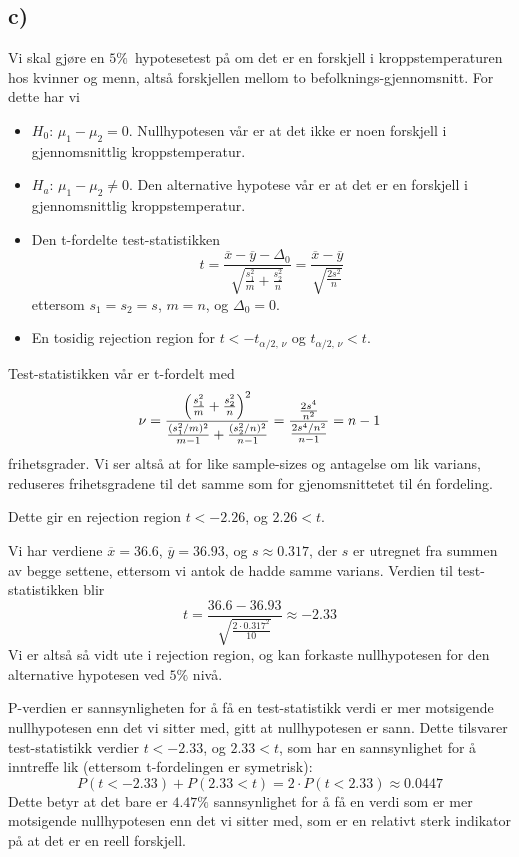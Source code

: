 \documentclass[12p,a4paper]{article}
\renewcommand{\bar}{\overline}
\begin{document}
\subsection*{c)}
Vi skal gjøre en $5\%$ hypotesetest på om det er en forskjell i kroppstemperaturen hos kvinner og menn, altså forskjellen mellom to befolknings-gjennomsnitt. For dette har vi
\begin{itemize}
    \item $H_0:\, \mu_1 - \mu_2 = 0$. Nullhypotesen vår er at det ikke er noen forskjell i gjennomsnittlig kroppstemperatur.
    \item $H_a:\, \mu_1 - \mu_2 \neq 0$. Den alternative hypotese vår er at det er en forskjell i gjennomsnittlig kroppstemperatur.
    \item Den t-fordelte test-statistikken \[ t = \frac{\bar{x} - \bar{y} - \Delta_0}{\sqrt{\frac{s_1^2}{m} + \frac{s_2^2}{n}}} = \frac{\bar{x} - \bar{y}}{\sqrt{\frac{2s^2}{n}}} \]
    ettersom $s_1 = s_2 = s$, $m=n$, og $\Delta_0 = 0$.
    \item En tosidig rejection region for $t < -t_{\alpha/2,\, \nu}$ og $ t_{\alpha/2,\, \nu} < t$.
\end{itemize}
Test-statistikken vår er t-fordelt med
\[
    \nu = \frac{\qty(\frac{s_1^2}{m}+\frac{s_2^2}{n})^2}{\frac{(s_1^2/m)^2}{m-1} + \frac{(s_2^2/n)^2}{n-1}}
    = \frac{\frac{2s^4}{n^2}}{\frac{2s^4/n^2}{n-1}} = n-1
\]
frihetsgrader. Vi ser altså at for like sample-sizes og antagelse om lik varians, reduseres frihetsgradene til det samme som for gjenomsnittetet til én fordeling.

Dette gir en rejection region $t < -2.26$, og $2.26 < t$.

Vi har verdiene $\bar{x} = 36.6$, $\bar{y} = 36.93$, og $s\approx 0.317$, der $s$ er utregnet fra summen av begge settene, ettersom vi antok de hadde samme varians. 
Verdien til test-statistikken blir
\begin{equation}\label{eqn:t}
    t = \frac{36.6 - 36.93}{\sqrt{\frac{2\cdot 0.317^2}{10}}} \approx -2.33
\end{equation}
Vi er altså så vidt ute i rejection region, og kan forkaste nullhypotesen for den alternative hypotesen ved $5\%$ nivå.

P-verdien er sannsynligheten for å få en test-statistikk verdi er mer motsigende nullhypotesen enn det vi sitter med, gitt at nullhypotesen er sann. Dette tilsvarer test-statistikk verdier $t < -2.33$, og $2.33 < t$, som har en sannsynlighet for å inntreffe lik (ettersom t-fordelingen er symetrisk):
\[
    P(t < -2.33) + P(2.33 < t) = 2\cdot P(t < 2.33) \approx 0.0447
\]
Dette betyr at det bare er $4.47\%$ sannsynlighet for å få en verdi som er mer motsigende nullhypotesen enn det vi sitter med, som er en relativt sterk indikator på at det er en reell forskjell.
\end{document}
